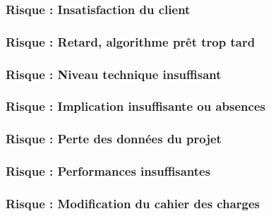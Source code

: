 \documentclass[a4paper,11pt,french]{article}
\begin{document}
\newpage
\subsubsection{Risque  : Insatisfaction du client}


\newpage
\subsubsection{Risque  : Retard, algorithme prêt trop tard}


\newpage
\subsubsection{Risque  : Niveau technique insuffisant}


\newpage
\subsubsection{Risque  : Implication insuffisante ou absences}


\newpage
\subsubsection{Risque  : Perte des données du projet }


\newpage
\subsubsection{Risque  : Performances insuffisantes }


\newpage
\subsubsection{Risque  : Modification du cahier des charges}

\end{document}
